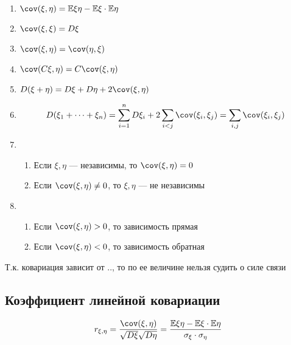 \begin{prop}
    \begin{enumerate}
        \item
              \(\cov(\xi, \eta) = \mathbb{E}\xi\eta - \mathbb{E}\xi\cdot \mathbb{E}\eta\)

        \item
              \(\cov(\xi, \xi) = D\xi\)

        \item
              \(\cov(\xi, \eta) = \cov(\eta, \xi)\)

        \item
              \(\cov(C\xi, \eta) = C\cov(\xi, \eta)\)

        \item
              \(D(\xi + \eta) = D\xi + D\eta + 2\cov(\xi, \eta)\)

        \item
              \[ D(\xi_1 + \dots + \xi_n) = \sum_{i = 1}^n D\xi_i + 2\sum_{i < j}\cov(\xi_i, \xi_j) = \sum_{i, j}\cov(\xi_i, \xi_j) \]

        \item
              \begin{enumerate}
                  \item Если \(\xi, \eta\) --- независимы, то \(\cov(\xi, \eta) = 0\)
                  \item Если \(\cov(\xi, \eta)\neq 0\), то \(\xi, \eta\) --- не независимы
              \end{enumerate}

        \item
              \begin{enumerate}
                  \item Если \(\cov(\xi, \eta)> 0\), то зависимость прямая
                  \item Если \(\cov(\xi, \eta) < 0\), то зависимость обратная
              \end{enumerate}

    \end{enumerate}
\end{prop}

\begin{remark}
    Т.к. ковариация зависит от .., то по ее величине нельзя судить о силе связи
\end{remark}

\subsection{Коэффициент линейной ковариации}
\[ r_{\xi, \eta} = \frac{\cov(\xi, \eta)}{\sqrt{D\xi}\sqrt{D\eta}} = \frac{\mathbb{E}\xi\eta - \mathbb{E}\xi\cdot \mathbb{E}\eta}{\sigma_\xi\cdot \sigma_\eta} \]

